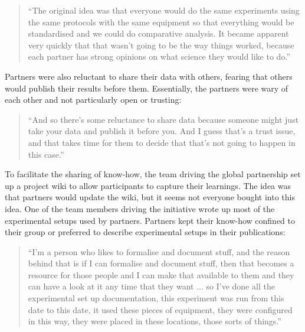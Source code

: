 \begin{quote}
\small
\enquote{The original idea was that everyone would do the same experiments using the same protocols with the same equipment so that everything would be standardised and we could do comparative analysis. It became apparent very quickly that that wasn't going to be the way things worked, because each partner has strong opinions on what science they would like to do.} \\
\end{quote}

Partners were also reluctant to share their data with others, fearing that others would publish their results before them. Essentially, the partners were wary of each other and not particularly open or trusting:

\begin{quote}
\small
\enquote{And so there's some reluctance to share data because someone might just take your data and publish it before you. And I guess that's a trust issue, and that takes time for them to decide that that's not going to happen in this case.} \\
\end{quote}

To facilitate the sharing of know-how, the team driving the global partnership set up a project wiki to allow participants to capture their learnings. The idea was that partners would update the wiki, but it seems not everyone bought into this idea. One of the team members driving the initiative wrote up most of the experimental setups used by partners. Partners kept their know-how confined to their group or preferred to describe experimental setups in their publications:

\begin{quote}
\small
\enquote{I'm a person who likes to formalise and document stuff, and the reason behind that is if I can formalise and document stuff, then that becomes a resource for those people and I can make that available to them and they can have a look at it any time that they want ... so I've done all the experimental set up documentation, this experiment was run from this date to this date, it used these pieces of equipment, they were configured in this way, they were placed in these locations, those sorts of things.} \\
\end{quote}

